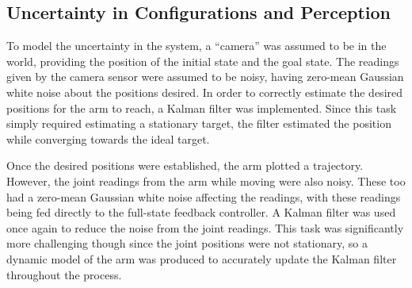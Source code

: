 \subsection*{Uncertainty in Configurations and Perception}
To model the uncertainty in the system, a ``camera'' was assumed to be in the world, providing the position of the initial state and the goal state.
The readings given by the camera sensor were assumed to be noisy, having zero-mean Gaussian white noise about the positions desired.
In order to correctly estimate the desired positions for the arm to reach, a Kalman filter was implemented.
Since this task simply required estimating a stationary target, the filter estimated the position while converging towards the ideal target.

Once the desired positions were established, the arm plotted a trajectory.
However, the joint readings from the arm while moving were also noisy.
These too had a zero-mean Gaussian white noise affecting the readings, with these readings being fed directly to the full-state feedback controller.
A Kalman filter was used once again to reduce the noise from the joint readings.
This task was significantly more challenging though since the joint positions were not stationary, so a dynamic model of the arm was produced to accurately update the Kalman filter throughout the process.
